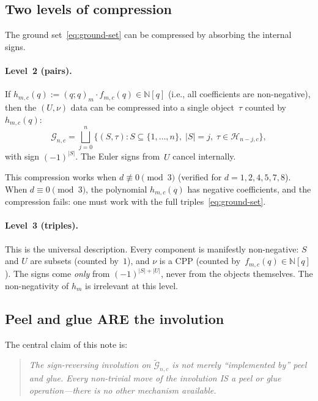 \documentclass[11pt]{article}
\newcommand{\N}{\mathbb{N}}
\newcommand{\qpochn}[3]{(#1;#2)_{#3}}
\theoremstyle{plain}
\theoremstyle{definition}
\begin{document}
\subsection{Two levels of compression}

The ground set~\eqref{eq:ground-set} can be compressed by absorbing
the internal signs.

\paragraph{Level~2 (pairs).}
If $h_{m,c}(q) := \qpochn{q}{q}{m} \cdot f_{m,c}(q) \in \N[q]$
(i.e., all coefficients are non-negative), then the $(U, \nu)$ data
can be compressed into a single object~$\tau$ counted by~$h_{m,c}(q)$:
\begin{equation}\label{eq:level2}
  \mathcal{G}_{n,c} = \bigsqcup_{j=0}^{n}
  \{(S, \tau) : S \subseteq \{1,\ldots,n\},\; |S| = j,\;
  \tau \in \mathcal{H}_{n-j,c}\},
\end{equation}
with sign $(-1)^{|S|}$.  The Euler signs from~$U$ cancel internally.

This compression works when $d \not\equiv 0 \pmod{3}$ (verified for
$d = 1, 2, 4, 5, 7, 8$).  When $d \equiv 0 \pmod{3}$, the polynomial
$h_{m,c}(q)$ has negative coefficients, and the compression fails:
one must work with the full triples~\eqref{eq:ground-set}.

\paragraph{Level~3 (triples).}
This is the universal description.  Every component is manifestly
non-negative: $S$ and $U$ are subsets (counted by~$1$), and $\nu$ is
a CPP (counted by~$f_{m,c}(q) \in \N[q]$).  The signs come
\emph{only} from $(-1)^{|S|+|U|}$, never from the objects themselves.
The non-negativity of $h_m$ is irrelevant at this level.


\subsection{Peel and glue ARE the involution}
\label{sec:involution}

The central claim of this note is:

\begin{quote}
\emph{The sign-reversing involution on $\widetilde{\mathcal{G}}_{n,c}$
is not merely ``implemented by'' peel and glue.  Every non-trivial
move of the involution IS a peel or glue operation---there is no other
mechanism available.}
\end{quote}
\end{document}

